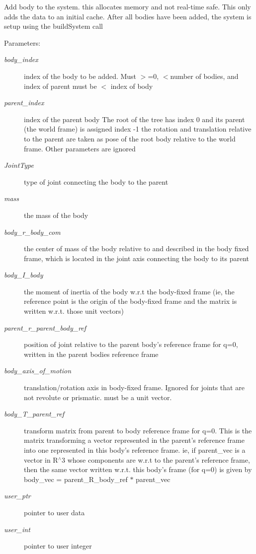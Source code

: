 Add body to the system. this allocates memory and not real-time safe. This only adds the data to an initial cache. After all bodies have been added, the system is setup using the buildSystem call \begin{Desc}
\item[Parameters:]
\begin{description}
\item[{\em body\_\-index}]index of the body to be added. Must $>$=0, $<$number of bodies, and index of parent must be $<$ index of body \item[{\em parent\_\-index}]index of the parent body The root of the tree has index 0 and its parent (the world frame) is assigned index -1 the rotation and translation relative to the parent are taken as pose of the root body relative to the world frame. Other parameters are ignored \item[{\em JointType}]type of joint connecting the body to the parent \item[{\em mass}]the mass of the body \item[{\em body\_\-r\_\-body\_\-com}]the center of mass of the body relative to and described in the body fixed frame, which is located in the joint axis connecting the body to its parent \item[{\em body\_\-I\_\-body}]the moment of inertia of the body w.r.t the body-fixed frame (ie, the reference point is the origin of the body-fixed frame and the matrix is written w.r.t. those unit vectors) \item[{\em parent\_\-r\_\-parent\_\-body\_\-ref}]position of joint relative to the parent body's reference frame for q=0, written in the parent bodies reference frame \item[{\em body\_\-axis\_\-of\_\-motion}]translation/rotation axis in body-fixed frame. Ignored for joints that are not revolute or prismatic. must be a unit vector. \item[{\em body\_\-T\_\-parent\_\-ref}]transform matrix from parent to body reference frame for q=0. This is the matrix transforming a vector represented in the parent's reference frame into one represented in this body's reference frame. ie, if parent\_\-vec is a vector in R$^\wedge$3 whose components are w.r.t to the parent's reference frame, then the same vector written w.r.t. this body's frame (for q=0) is given by body\_\-vec = parent\_\-R\_\-body\_\-ref $\ast$ parent\_\-vec \item[{\em user\_\-ptr}]pointer to user data \item[{\em user\_\-int}]pointer to user integer \end{description}
\end{Desc}

